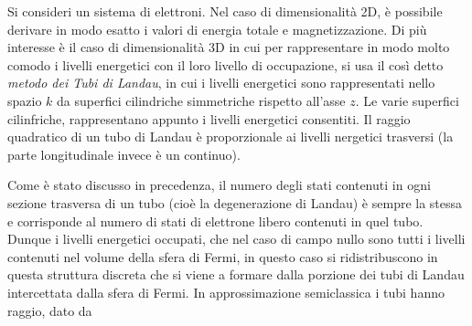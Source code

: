 Si consideri un sistema di elettroni. Nel caso di dimensionalit\`a 2D, \`e possibile derivare in modo esatto i valori di energia totale e magnetizzazione. Di pi\`u interesse \`e il caso di dimensionalit\`a 3D in cui per rappresentare in modo molto comodo i livelli energetici con il loro livello di occupazione, si usa il cos\`i detto \textit{metodo dei Tubi di Landau}, in cui i livelli energetici sono rappresentati nello spazio $k$ da superfici cilindriche simmetriche rispetto all'asse $z$. Le varie superfici cilinfriche, rappresentano appunto i livelli energetici consentiti. Il raggio quadratico di un tubo di Landau \`e proporzionale ai livelli nergetici trasversi (la parte longitudinale invece \`e un continuo).

Come \`e stato discusso in precedenza, il numero degli stati contenuti in ogni sezione trasversa di un tubo (cio\`e la degenerazione di Landau) \`e sempre la stessa e corrisponde al numero di stati di elettrone libero contenuti in quel tubo. Dunque i livelli energetici occupati, che nel caso di campo nullo sono tutti i livelli contenuti nel volume della sfera di Fermi, in questo caso si ridistribuscono in questa struttura discreta che si viene a formare dalla porzione dei tubi di Landau intercettata dalla sfera di Fermi. In approssimazione semiclassica i tubi hanno raggio, dato da









